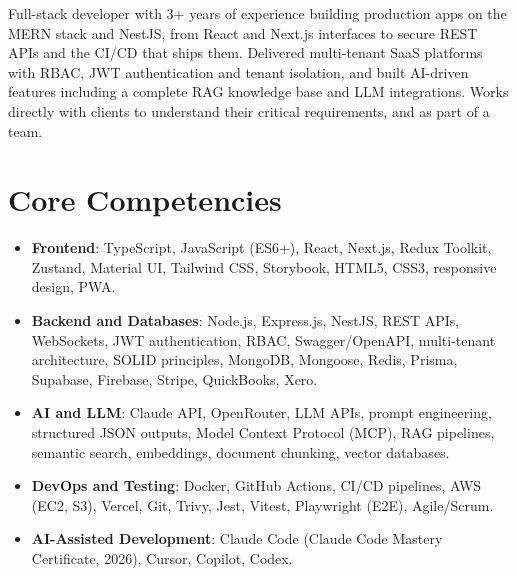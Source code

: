 \documentclass[11pt,a4paper,sans]{moderncv}
\begin{document}
\makecvtitle


\vspace{6pt}
\small{Full-stack developer with 3+ years of experience building production apps on the MERN stack and NestJS, from React and Next.js interfaces to secure REST APIs and the CI/CD that ships them. Delivered multi-tenant SaaS platforms with RBAC, JWT authentication and tenant isolation, and built AI-driven features including a complete RAG knowledge base and LLM integrations. Works directly with clients to understand their critical requirements, and as part of a team.}


\section{Core Competencies}
\vspace{1pt}
\begin{itemize}

\item \textbf{Frontend}: TypeScript, JavaScript (ES6+), React, Next.js, Redux Toolkit, Zustand, Material UI, Tailwind CSS, Storybook, HTML5, CSS3, responsive design, PWA.

\item \textbf{Backend and Databases}: Node.js, Express.js, NestJS, REST APIs, WebSockets, JWT authentication, RBAC, Swagger/OpenAPI, multi-tenant architecture, SOLID principles, MongoDB, Mongoose, Redis, Prisma, Supabase, Firebase, Stripe, QuickBooks, Xero.

\item \textbf{AI and LLM}: Claude API, OpenRouter, LLM APIs, prompt engineering, structured JSON outputs, Model Context Protocol (MCP), RAG pipelines, semantic search, embeddings, document chunking, vector databases.

\item \textbf{DevOps and Testing}: Docker, GitHub Actions, CI/CD pipelines, AWS (EC2, S3), Vercel, Git, Trivy, Jest, Vitest, Playwright (E2E), Agile/Scrum.

\item \textbf{AI-Assisted Development}: Claude Code (Claude Code Mastery Certificate, 2026), Cursor, Copilot, Codex.

\end{itemize}
\end{document}

